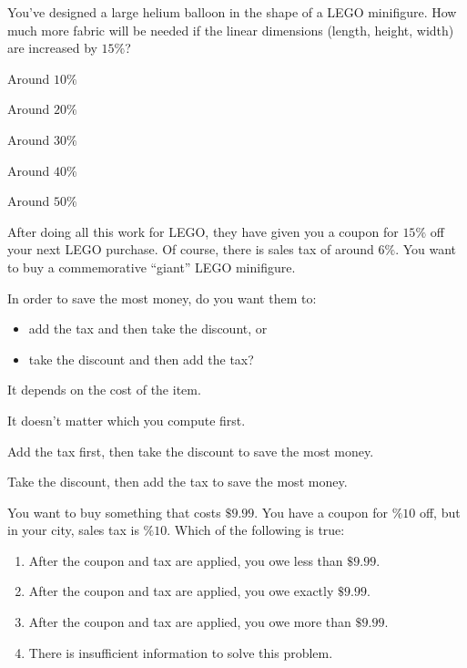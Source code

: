 \documentclass[noauthor,nooutcomes]{ximera}
\begin{document}
\begin{exercise}
  You've designed a large helium balloon in the shape of a LEGO
  minifigure. How much more fabric will be needed if the linear
  dimensions (length, height, width) are increased by $15\%$?
  \begin{enumerate}\begin{multicols}{2}
    \item Around $10\%$
    \item Around $20\%$
    \item Around $30\%$
    \item Around $40\%$
    \item Around $50\%$
    \end{multicols}
  \end{enumerate}
\end{exercise}






\begin{exercise}
  After doing all this work for LEGO, they have given you a coupon for
  $15\%$ off your next LEGO purchase. Of course, there is sales tax of
  around $6\%$.  You want to buy a commemorative ``giant'' LEGO
  minifigure.

  In order to save the most money, do you want them to:
  \begin{itemize}
  \item add the tax and then take the discount, or
  \item take the discount and then add the tax?
  \end{itemize}
  \begin{enumerate}\begin{multicols}{2}
  \item It depends on the cost of the item.
  \item It doesn't matter which you compute first.
  \item Add the tax first, then take the discount to save the most money.
  \item Take the discount, then add the tax to save the most money.
    \end{multicols}
  \end{enumerate}
\end{exercise}



\begin{exercise}
  You want to buy something that costs $\$9.99$. You have a coupon for
  $\%10$ off, but in your city, sales tax is $\%10$. Which of the
  following is true:
  \begin{enumerate}
    \item After the coupon and tax are applied, you owe less than
    $\$9.99$.
    \item After the coupon and tax are applied, you owe exactly
      $\$9.99$.
    \item After the coupon and tax are applied, you owe more than
      $\$9.99$.
    \item There is insufficient information to solve this problem.
  \end{enumerate}
\end{exercise}



\end{document}
